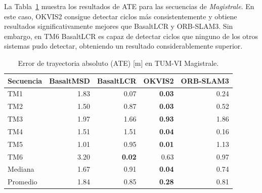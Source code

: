 La Tabla~\ref{tab:magistrale_sota_ate} muestra los resultados de ATE para las secuencias de \textit{Magistrale}. En este caso, OKVIS2 consigue detectar ciclos más consistentemente y obtiene resultados significativamente mejores que BasaltLCR y ORB-SLAM3. Sin embargo, en TM6 BasaltLCR es capaz de detectar ciclos que ninguno de los otros sistemas pudo detectar, obteniendo un resultado considerablemente superior.
%
\begin{table}[!htbp]
\centering
\caption{Error de trayectoria absoluto (ATE) [m] en TUM-VI Magistrale.}
\label{tab:magistrale_sota_ate}
\begin{tabular}{lrrrr}
\toprule
\textbf{Secuencia} & \textbf{BasaltMSD} & \textbf{BasaltLCR} & \textbf{OKVIS2} & \textbf{ORB-SLAM3} \\
\midrule
TM1 & 1.83 & 0.07 & \textbf{0.03} & 0.24 \\
TM2 & 1.50 & 0.87 & \textbf{0.03} & 0.52 \\
TM3 & 1.97 & 1.66 & \textbf{0.93} & 1.86 \\
TM4 & 1.51 & 1.51 & \textbf{0.04} & 0.16 \\
TM5 & 1.01 & 0.95 & \textbf{0.01} & 1.13 \\
TM6 & 3.20 & \textbf{0.02} & 0.63 & 0.97 \\
\midrule
Mediana & 1.67 & 0.91 & \textbf{0.04} & 0.74 \\
Promedio & 1.84 & 0.85 & \textbf{0.28} & 0.81 \\
\bottomrule
\end{tabular}
\end{table}

